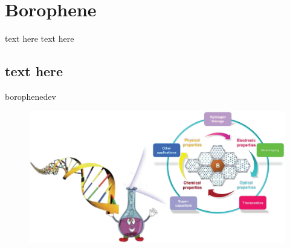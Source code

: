 \documentclass[handout,t]{beamer}
\begin{document}
\section{Borophene}
\begin{frame}{text here}
	text here
\end{frame}
\subsection{text here}
\begin{frame}{borophenedev}
	\begin{figure}[!h]
		\centering
		\includegraphics[width=\linewidth]{../figures/borophenedev.png}
		\label{fig:borophenedev}
	\end{figure}
\end{frame}
\end{document}
